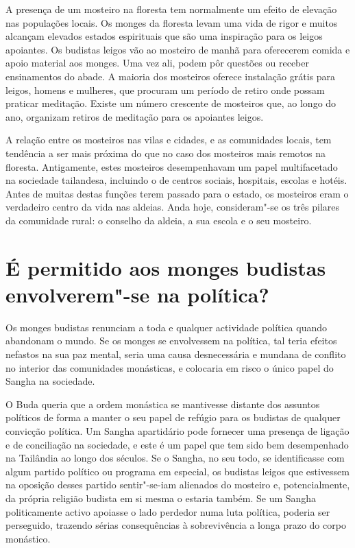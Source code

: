 A presença de um mosteiro na floresta tem normalmente um efeito de
elevação nas populações locais. Os monges da floresta levam uma vida de
rigor e muitos alcançam elevados estados espirituais que são uma
inspiração para os leigos apoiantes. Os budistas leigos vão ao mosteiro
de manhã para oferecerem comida e apoio material aos monges. Uma vez
ali, podem pôr questões ou receber ensinamentos do abade. A maioria dos
mosteiros oferece instalação grátis para leigos, homens e mulheres, que
procuram um período de retiro onde possam praticar meditação. Existe um
número crescente de mosteiros que, ao longo do ano, organizam retiros de
meditação para os apoiantes leigos.

A relação entre os mosteiros nas vilas e cidades, e as comunidades
locais, tem tendência a ser mais próxima do que no caso dos mosteiros
mais remotos na floresta. Antigamente, estes mosteiros desempenhavam um
papel multifacetado na sociedade tailandesa, incluindo o de centros
sociais, hospitais, escolas e hotéis. Antes de muitas destas funções
terem passado para o estado, os mosteiros eram o verdadeiro centro da
vida nas aldeias. Anda hoje, consideram"-se os três pilares da comunidade
rural: o conselho da aldeia, a sua escola e o seu mosteiro.

\section{É permitido aos monges budistas envolverem"-se na política?}

Os monges budistas renunciam a toda e qualquer actividade política
quando abandonam o mundo. Se os monges se envolvessem na política, tal
teria efeitos nefastos na sua paz mental, seria uma causa desnecessária
e mundana de conflito no interior das comunidades monásticas, e
colocaria em risco o único papel do Sangha na sociedade.

O Buda queria que a ordem monástica se mantivesse distante dos assuntos
políticos de forma a manter o seu papel de refúgio para os budistas de
qualquer convicção política. Um Sangha apartidário pode fornecer uma
presença de ligação e de conciliação na sociedade, e este é um papel que
tem sido bem desempenhado na Tailândia ao longo dos séculos. Se o
Sangha, no seu todo, se identificasse com algum partido político ou
programa em especial, os budistas leigos que estivessem na oposição
desses partido sentir"-se-iam alienados do mosteiro e, potencialmente, da
própria religião budista em si mesma o estaria também. Se um Sangha
politicamente activo apoiasse o lado perdedor numa luta política, poderia
ser perseguido, trazendo sérias consequências à sobrevivência a longa
prazo do corpo monástico.

